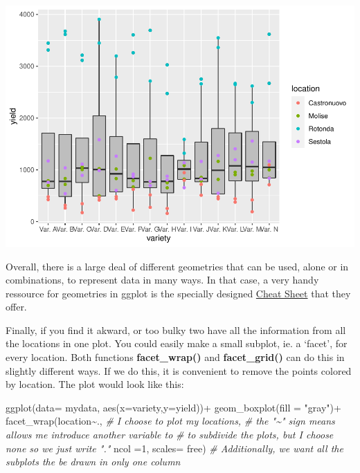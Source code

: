 \documentclass[
]{book}
\newenvironment{Shaded}{\begin{snugshade}}{\end{snugshade}}
\newcommand{\AttributeTok}[1]{\textcolor[rgb]{0.77,0.63,0.00}{#1}}
\newcommand{\CommentTok}[1]{\textcolor[rgb]{0.56,0.35,0.01}{\textit{#1}}}
\newcommand{\DecValTok}[1]{\textcolor[rgb]{0.00,0.00,0.81}{#1}}
\newcommand{\FunctionTok}[1]{\textcolor[rgb]{0.00,0.00,0.00}{#1}}
\newcommand{\NormalTok}[1]{#1}
\newcommand{\SpecialCharTok}[1]{\textcolor[rgb]{0.00,0.00,0.00}{#1}}
\newcommand{\StringTok}[1]{\textcolor[rgb]{0.31,0.60,0.02}{#1}}
\begin{document}
\includegraphics[width=1.5\linewidth]{PPB-Toolkit-for-R-and-R-Studio_files/figure-latex/unnamed-chunk-68-1}

Overall, there is a large deal of different geometries that can be used, alone or in combinations, to represent data in many ways. In that case, a very handy ressource for geometries in ggplot is the specially designed \href{https://www.maths.usyd.edu.au/u/UG/SM/STAT3022/r/current/Misc/data-visualization-2.1.pdf}{Cheat Sheet} that they offer.

Finally, if you find it akward, or too bulky two have all the information from all the locations in one plot. You could easily make a small subplot, ie. a `facet', for every location. Both functions \textbf{facet\_wrap() } and \textbf{facet\_grid() } can do this in slightly different ways. If we do this, it is convenient to remove the points colored by location. The plot would look like this:

\begin{Shaded}
\begin{Highlighting}[]
\FunctionTok{ggplot}\NormalTok{(}\AttributeTok{data=}\NormalTok{ mydata,  }\FunctionTok{aes}\NormalTok{(}\AttributeTok{x=}\NormalTok{variety,}\AttributeTok{y=}\NormalTok{yield))}\SpecialCharTok{+} 
  \FunctionTok{geom\_boxplot}\NormalTok{(}\AttributeTok{fill =} \StringTok{"gray"}\NormalTok{)}\SpecialCharTok{+} 
  \FunctionTok{facet\_wrap}\NormalTok{(location}\SpecialCharTok{\textasciitilde{}}\NormalTok{., }\CommentTok{\# I choose to plot my locations, }
                         \CommentTok{\# the "\textasciitilde{}" sign means allows me introduce another variable to }
                         \CommentTok{\# to subdivide the plots, but I choose none so we just write "."}
             \AttributeTok{ncol =}\DecValTok{1}\NormalTok{,}
             \AttributeTok{scales=} \StringTok{\textquotesingle{}free\textquotesingle{}}\NormalTok{)    }\CommentTok{\# Additionally, we want all the subplots the be drawn in only one column}
\end{Highlighting}
\end{Shaded}
\end{document}
